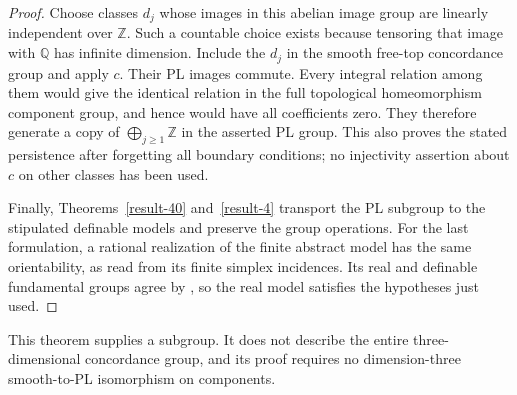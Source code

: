 \begin{proof}
Choose classes $d_j$ whose images in this abelian image group are
linearly independent over $\mathbb Z$.  Such a countable choice
exists because tensoring that image with $\mathbb Q$ has infinite
dimension.  Include the $d_j$ in the smooth free-top concordance
group and apply $c$.  Their PL images commute.  Every integral
relation among them would give the identical relation in the full
topological homeomorphism component group, and hence would have
all coefficients zero.  They therefore generate a copy of
$\bigoplus_{j\geq1}\mathbb Z$ in the asserted PL group.  This also
proves the stated persistence after forgetting all boundary
conditions; no injectivity assertion about $c$ on other classes
has been used.

Finally, Theorems~\ref{result-40} and~\ref{result-4} transport the
PL subgroup to the stipulated definable models and preserve the
group operations.  For the last formulation, a rational realization
of the finite abstract model has the same orientability, as read
from its finite simplex incidences.  Its real and definable
fundamental groups agree by
\cite[arXiv version~1, Corollary~4.3, p.~10]{BaroOtero2008v1},
so the real model satisfies the hypotheses just used.
\end{proof}

This theorem supplies a subgroup.  It does not describe the entire
three-dimensional concordance group, and its proof requires no
dimension-three smooth-to-PL isomorphism on components.
